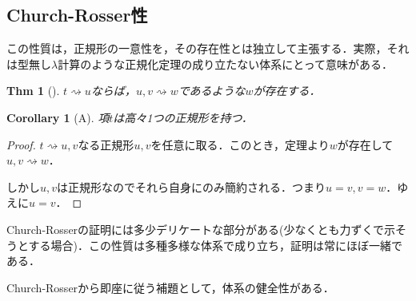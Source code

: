 \documentclass[a4paper,10pt,platex, dvipdfmx]{jsarticle}
\newtheorem{thm}{Thm}
\newtheorem{corollary}{Corollary}
\begin{document}
\subsection{Church-Rosser性}
この性質は，正規形の一意性を，その存在性とは独立して主張する．実際，それは型無し$\lambda$計算のような正規化定理の成り立たない体系にとって意味がある．
\begin{thm}[]
    $t\rightsquigarrow u$ならば，$u, v\rightsquigarrow w$であるような$w$が存在する．
\end{thm}
\begin{figure}[H]
    \centering
{}
\end{figure}
\begin{corollary}[A]
    項$t$は高々1つの正規形を持つ．
\end{corollary}
\begin{proof}
    $t \rightsquigarrow u ,v$なる正規形$u, v$を任意に取る．このとき，定理より$w$が存在して$u, v\rightsquigarrow w$．

    しかし$u, v$は正規形なのでそれら自身にのみ簡約される．つまり$u = v, v = w$．ゆえに$u = v$．
\end{proof}
Church-Rosserの証明には多少デリケートな部分がある(少なくとも力ずくで示そうとする場合)．この性質は多種多様な体系で成り立ち，証明は常にほぼ一緒である．

Church-Rosserから即座に従う補題として，体系の健全性がある．
\end{document}
